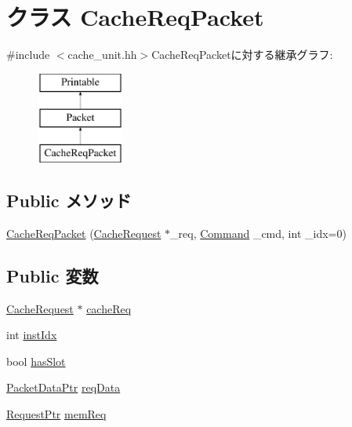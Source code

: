 \hypertarget{classCacheReqPacket}{
\section{クラス CacheReqPacket}
\label{classCacheReqPacket}
}


{\ttfamily \#include $<$cache\_\-unit.hh$>$}CacheReqPacketに対する継承グラフ:\begin{figure}[H]
\begin{center}
\leavevmode
\includegraphics[height=3cm]{classCacheReqPacket}
\end{center}
\end{figure}
\subsection*{Public メソッド}
\begin{DoxyCompactItemize}
\item 
\hyperlink{classCacheReqPacket_a6c9a8817086ff7350caa2bf976f7b7b7}{CacheReqPacket} (\hyperlink{classCacheRequest}{CacheRequest} $\ast$\_\-req, \hyperlink{classMemCmd_a2afce0a47a93eee73a314d53e4890153}{Command} \_\-cmd, int \_\-idx=0)
\end{DoxyCompactItemize}
\subsection*{Public 変数}
\begin{DoxyCompactItemize}
\item 
\hyperlink{classCacheRequest}{CacheRequest} $\ast$ \hyperlink{classCacheReqPacket_ac55dd41eb7bb1d4c2abf3ef65d8c9a02}{cacheReq}
\item 
int \hyperlink{classCacheReqPacket_a65152017e4eb674a60e1b6c374b2df6f}{instIdx}
\item 
bool \hyperlink{classCacheReqPacket_a28e9cd0c873d2bd6b2ac86283f614469}{hasSlot}
\item 
\hyperlink{packet_8hh_ae85a9de970f801a77a1ad88ee2b39ea2}{PacketDataPtr} \hyperlink{classCacheReqPacket_a3c85036decf244a8280a1ca878e81b34}{reqData}
\item 
\hyperlink{classRequest}{RequestPtr} \hyperlink{classCacheReqPacket_a5520eb2f7c2cf4b0e109d6ffd6d2d053}{memReq}
\end{DoxyCompactItemize}


